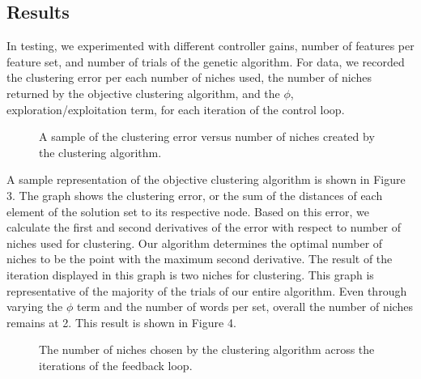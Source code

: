 \documentclass{sig-alternate}
\begin{document}
\subsection{Results}
In testing, we experimented with different controller gains, number of features per feature set, and number of trials of the genetic algorithm. For data, we recorded the clustering error per each number of niches used, the number of niches returned by the objective clustering algorithm, and the $\phi$, exploration/exploitation term, for each iteration of the control loop.
\begin{figure}[t]
\centering
{}
\caption{A sample of the clustering error versus number of niches created by the clustering algorithm.}
\label{fig:graph1}
\end{figure}
A sample representation of the objective clustering algorithm is shown in Figure 3. The graph shows the clustering error, or the sum of the distances of each element of the solution set to its respective node. Based on this error, we calculate the first and second derivatives of the error with respect to number of niches used for clustering. Our algorithm determines the optimal number of niches to be the point with the maximum second derivative. The result of the iteration displayed in this graph is two niches for clustering. This graph is representative of the majority of the trials of our entire algorithm. Even through varying the $\phi$ term and the number of words per set, overall the number of niches remains at 2. This result is shown in Figure 4.
\begin{figure}[t]
\centering
{}
\caption{The number of niches chosen by the clustering algorithm across the iterations of the feedback loop.}
\label{fig:graph2}
\end{figure}
\end{document}
